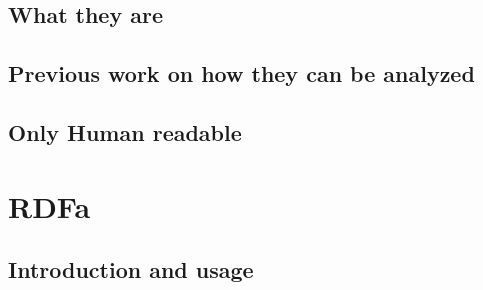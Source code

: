 \subsection{What they are}
\subsection{Previous work on how they can be analyzed}
\subsection{Only Human readable}

\section{RDFa}
\subsection{Introduction and usage}



